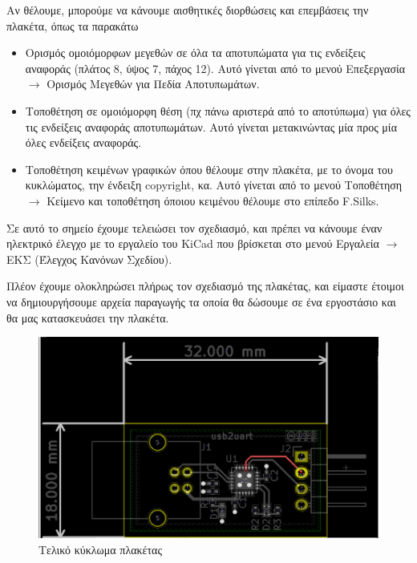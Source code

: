 \documentclass[a4paper]{article}
\begin{document}
Αν θέλουμε, μπορούμε να κάνουμε αισθητικές διορθώσεις και επεμβάσεις την πλακέτα, όπως τα παρακάτω
\begin{itemize}
    \item Ορισμός ομοιόμορφων μεγεθών σε όλα τα αποτυπώματα για τις ενδείξεις αναφοράς (πλάτος 8, ύψος 7, πάχος 12). Αυτό γίνεται από το μενού Επεξεργασία $\rightarrow$ Ορισμός Μεγεθών για Πεδία Αποτυπωμάτων.
    \item Τοποθέτηση σε ομοιόμορφη θέση (πχ πάνω αριστερά από το αποτύπωμα) για όλες τις ενδείξεις αναφοράς αποτυπωμάτων. Αυτό γίνεται μετακινώντας μία προς μία όλες ενδείξεις αναφοράς.
    \item Τοποθέτηση κειμένων γραφικών όπου θέλουμε στην πλακέτα, με το όνομα του κυκλώματος, την ένδειξη copyright, κα. Αυτό γίνεται από το μενού Τοποθέτηση $\rightarrow$ Κείμενο και τοποθέτηση όποιου κειμένου θέλουμε στο επίπεδο F.Silks.
\end{itemize}

\begin{figure}
  \begin{center}
    \label{fig:kicad-main}
  \end{center}
\end{figure}

Σε αυτό το σημείο έχουμε τελειώσει τον σχεδιασμό, και πρέπει να κάνουμε έναν ηλεκτρικό έλεγχο με το εργαλείο του \textenglish{KiCad} που βρίσκεται στο μενού Εργαλεία $\rightarrow$ ΕΚΣ (Έλεγχος Κανόνων Σχεδίου).

Πλέον έχουμε ολοκληρώσει πλήρως τον σχεδιασμό της πλακέτας, και είμαστε έτοιμοι να δημιουργήσουμε αρχεία παραγωγής τα οποία θα δώσουμε σε ένα εργοστάσιο και θα μας κατασκευάσει την πλακέτα.

\begin{figure}
  \begin{center}
    \includegraphics[width=.9\textwidth]{img/final-pcb.png}
    \caption{Τελικό κύκλωμα πλακέτας}
    \label{fig:final-pcb}
  \end{center}
\end{figure}
\end{document}
